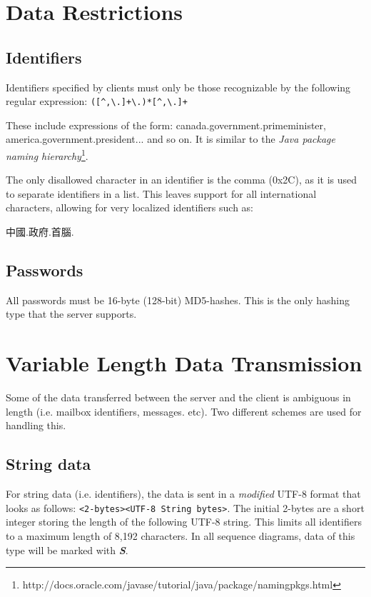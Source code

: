 \documentclass[10pt]{report}
\begin{document}
\section{Data Restrictions}

\subsection{Identifiers}

Identifiers specified by clients must only be those recognizable by the following regular expression: \verb|([^,\.]+\.)*[^,\.]+|

These include expressions of the form: canada.government.primeminister, america.government.president... and so on. It is similar to the \emph{Java package naming hierarchy}\footnote{http://docs.oracle.com/javase/tutorial/java/package/namingpkgs.html}.

The only disallowed character in an identifier is the comma (0x2C), as it is used to separate identifiers in a list. This leaves support for all international characters, allowing for very localized identifiers such as: \begin{CJK*}{UTF8}{min}
中國.政府.首腦.\end{CJK*}

\subsection{Passwords}

All passwords must be 16-byte (128-bit) MD5-hashes. This is the only hashing type that the server supports.

\section{Variable Length Data Transmission}

Some of the data transferred between the server and the client is ambiguous in length (i.e. mailbox identifiers, messages. etc). Two different schemes are used for handling this.

\subsection{String data}
\label{string_data}

For string data (i.e. identifiers), the data is sent in a \emph{modified} UTF-8 format that looks as follows: \verb|<2-bytes><UTF-8 String bytes>|. The initial 2-bytes are a short integer storing the length of the following UTF-8 string. This limits all identifiers to a maximum length of 8,192 characters. In all sequence diagrams, data of this type will be marked with \emph{\textbf{S}}.
\end{document}
